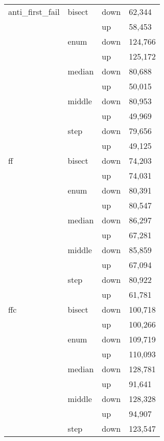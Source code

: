 \begin{longtable}{llll}
\multicolumn{1}{l}{anti\_first\_fail} & \multicolumn{1}{l}{bisect} & down  & 62,344 \\
          &       & up    & 58,453 \\
          & \multicolumn{1}{l}{enum} & down  & 124,766 \\
          &       & up    & 125,172 \\
          & \multicolumn{1}{l}{median} & down  & 80,688 \\
          &       & up    & 50,015 \\
          & \multicolumn{1}{l}{middle} & down  & 80,953 \\
          &       & up    & 49,969 \\
          & \multicolumn{1}{l}{step} & down  & 79,656 \\
          &       & up    & 49,125 \\ \hline
    \multicolumn{1}{l}{ff} & \multicolumn{1}{l}{bisect} & down  & 74,203 \\
          &       & up    & 74,031 \\
          & \multicolumn{1}{l}{enum} & down  & 80,391 \\
          &       & up    & 80,547 \\
          & \multicolumn{1}{l}{median} & down  & 86,297 \\
          &       & up    & 67,281 \\
          & \multicolumn{1}{l}{middle} & down  & 85,859 \\
          &       & up    & 67,094 \\
          & \multicolumn{1}{l}{step} & down  & 80,922 \\
          &       & up    & 61,781 \\ \hline
    \multicolumn{1}{l}{ffc} & \multicolumn{1}{l}{bisect} & down  & 100,718 \\
          &       & up    & 100,266 \\
          & \multicolumn{1}{l}{enum} & down  & 109,719 \\
          &       & up    & 110,093 \\
          & \multicolumn{1}{l}{median} & down  & 128,781 \\
          &       & up    & 91,641 \\
          & \multicolumn{1}{l}{middle} & down  & 128,328 \\
          &       & up    & 94,907 \\
          & \multicolumn{1}{l}{step} & down  & 123,547 \\

\end{longtable}
